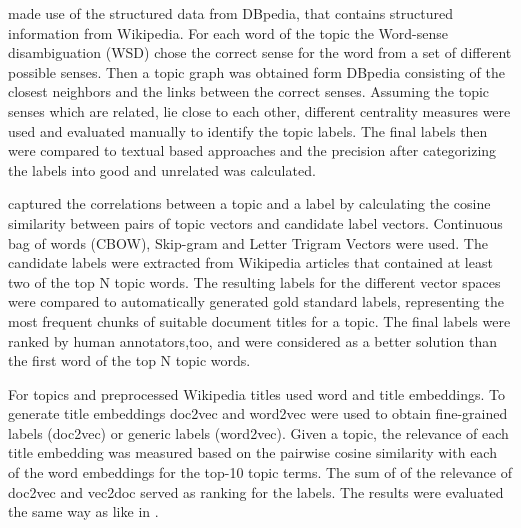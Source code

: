 \textit{\cite{Hulpus2013}} made use of the structured data from DBpedia, that contains structured information from Wikipedia. For each word of the topic the Word-sense disambiguation (WSD) chose the correct sense for the word from a set of different possible senses. Then a topic graph was obtained form DBpedia consisting of the closest neighbors and the links between the correct senses. Assuming the topic senses which are related, lie close to each other, different centrality measures were used and evaluated manually to identify the topic labels. The final labels then were compared to textual based approaches and the precision after categorizing the labels into good and unrelated was calculated.

\cite{Kou2015} captured the correlations between a topic and a label by calculating the cosine similarity between pairs of topic vectors and candidate label vectors. Continuous bag of words (CBOW), Skip-gram and Letter Trigram Vectors were used. The candidate labels were extracted from Wikipedia articles that contained at least two of the top N topic words. The resulting labels for the different vector spaces were compared to automatically generated gold standard labels, representing the most frequent chunks of suitable document titles for a topic. The final labels were ranked by human annotators,too, and were considered as a better solution than the first word of the top N topic words. 


For topics and preprocessed Wikipedia titles \textit{\cite{Bhatia2016}} used word and title embeddings. To generate title embeddings doc2vec and word2vec were used to obtain fine-grained labels (doc2vec) or generic labels (word2vec). Given a topic, the relevance of each title embedding was measured based on the pairwise cosine similarity with each of the word embeddings for the top-10 topic terms. The sum of of the relevance of doc2vec and vec2doc served as ranking for the labels. The results were evaluated the same way as like in \cite{Lau2011}.

